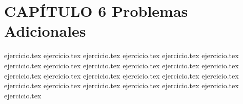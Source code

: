 
\section*{CAPÍTULO 6 \quad Problemas Adicionales}

\begin{enumerate}
    {ejercicio.tex}
{ejercicio.tex}
{ejercicio.tex}
{ejercicio.tex}
{ejercicio.tex}
{ejercicio.tex}
{ejercicio.tex}
{ejercicio.tex}
{ejercicio.tex}
{ejercicio.tex}
{ejercicio.tex}
{ejercicio.tex}
{ejercicio.tex}
{ejercicio.tex}
{ejercicio.tex}
{ejercicio.tex}
{ejercicio.tex}
{ejercicio.tex}
{ejercicio.tex}
{ejercicio.tex}
{ejercicio.tex}
{ejercicio.tex}
{ejercicio.tex}
{ejercicio.tex}
{ejercicio.tex}
\end{enumerate}
